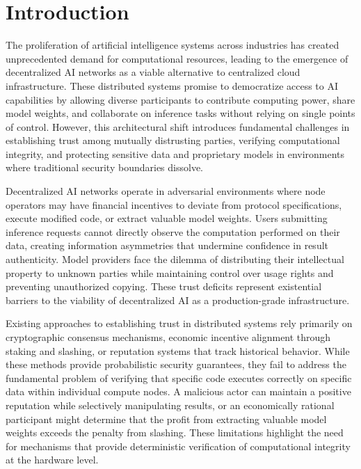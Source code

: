 \section{Introduction}

The proliferation of artificial intelligence systems across industries has created unprecedented demand for computational resources, leading to the emergence of decentralized AI networks as a viable alternative to centralized cloud infrastructure. These distributed systems promise to democratize access to AI capabilities by allowing diverse participants to contribute computing power, share model weights, and collaborate on inference tasks without relying on single points of control. However, this architectural shift introduces fundamental challenges in establishing trust among mutually distrusting parties, verifying computational integrity, and protecting sensitive data and proprietary models in environments where traditional security boundaries dissolve.

Decentralized AI networks operate in adversarial environments where node operators may have financial incentives to deviate from protocol specifications, execute modified code, or extract valuable model weights. Users submitting inference requests cannot directly observe the computation performed on their data, creating information asymmetries that undermine confidence in result authenticity. Model providers face the dilemma of distributing their intellectual property to unknown parties while maintaining control over usage rights and preventing unauthorized copying. These trust deficits represent existential barriers to the viability of decentralized AI as a production-grade infrastructure.

Existing approaches to establishing trust in distributed systems rely primarily on cryptographic consensus mechanisms, economic incentive alignment through staking and slashing, or reputation systems that track historical behavior. While these methods provide probabilistic security guarantees, they fail to address the fundamental problem of verifying that specific code executes correctly on specific data within individual compute nodes. A malicious actor can maintain a positive reputation while selectively manipulating results, or an economically rational participant might determine that the profit from extracting valuable model weights exceeds the penalty from slashing. These limitations highlight the need for mechanisms that provide deterministic verification of computational integrity at the hardware level.

